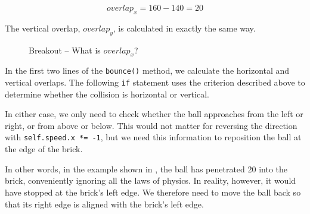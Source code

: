 \[
overlap_x = 160 - 140 = 20
\]

The vertical overlap, $overlap_y$, is calculated in exactly the same way.

\begin{figure}[htbp]
	\centering
{}
\caption{Breakout -- What is $overlap_x$?}
\label{picBreakoutOverlab}
\end{figure}


In the first two lines of the \texttt{bounce()} method, we calculate the horizontal and vertical overlaps. The following \texttt{if} statement uses the criterion described above to determine whether the collision is horizontal or vertical.

In either case, we only need to check whether the ball approaches from the left or right, or from above or below. This would not matter for reversing the direction with \texttt{self.speed.x *= -1}, but we need this information to reposition the ball at the edge of the brick.

In other words, in the example shown in , the ball has penetrated \SI{20}{\pixel} into the brick, conveniently ignoring all the laws of physics. In reality, however, it would have stopped at the brick's left edge. We therefore need to move the ball back so that its right edge is aligned with the brick's left edge.



